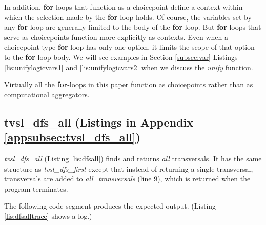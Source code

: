 In addition, \textbf{for}-loops that function as a choicepoint define a context within which the selection made by the \textbf{for}-loop holds. Of course, the variables set by any \textbf{for}-loop are generally limited to the body of the \textbf{for}-loop. But \textbf{for}-loops that serve as choicepoints function more explicitly as contexts. Even when a choicepoint-type \textbf{for}-loop has only one option, it limits the scope of that option to the \textbf{for}-loop body. We will see examples in Section \ref{subsec:var} Listings \ref{lis:unifylogicvars1} and \ref{lis:unifylogicvars2} when we discuss the \textit{unify} function.

Virtually all the \textbf{for}-loops in this paper function as choicepoints rather than as computational aggregators. 

\subsection{tvsl\_dfs\_all (Listings in Appendix \ref{appsubsec:tvsl_dfs_all})} \label{subsec:tvsl_dfs_all}



\textit{tvsl\_dfs\_all} (Listing \ref{lis:dfsall}) finds and returns \textit{all} transversals. It has the same structure as \textit{tvsl\_dfs\_first} except that instead of returning a single transversal, transversals are added to \textit{all\_transversals} (line 9), which is returned when the program terminates. 

The following code segment produces the expected output.  (Listing \ref{lis:dfsalltrace} shows a log.)

